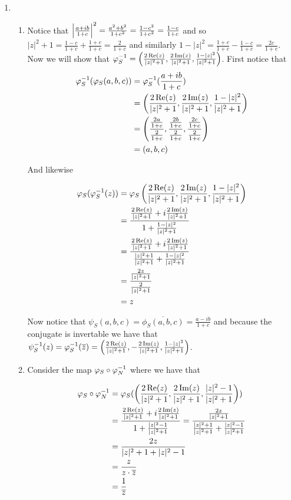 \documentclass[12pt]{amsart}
\begin{document}
\begin{enumerate}
\item 
\begin{enumerate}
    \item Notice that $\left| \frac{a+ib}{1+c} \right|^2=\frac{a^2+b^2}{1+c^2}=\frac{1-c^2}{1+c^2}=\frac{1-c}{1+c}$ and so $|z|^2+1=\frac{1-c}{1+c}+\frac{1+c}{1+c}=\frac{2}{1+c}$ and similarly $1-|z|^2=\frac{1+c}{1+c}-\frac{1-c}{1+c}=\frac{2c}{1+c}$. Now we will show that $\oldphi_S^{-1}=\left(\frac{2\Real(z)}{|z|^2+1}, \frac{2\Imag(z)}{|z|^2+1}, \frac{1-|z|^2}{|z|^2+1}\right)$. First notice that 
\begin{align*}
    \oldphi^{-1}_S(\oldphi_S(a,b,c))&=\oldphi^{-1}_S(\frac{a+ib}{1+c})\\
    &=\left(\frac{2\Real(z)}{|z|^2+1}, \frac{2\Imag(z)}{|z|^2+1}, \frac{1-|z|^2}{|z|^2+1}\right)\\
    &=\left(\frac{\frac{2a}{1+c}}{\frac{2}{1+c}}, \frac{\frac{2b}{1+c}}{\frac{2}{1+c}}, \frac{\frac{2c}{1+c}}{\frac{2}{1+c}}\right)\\
    &=\left(a, b, c\right)\\
\end{align*}

And likewise 

\begin{align*}
    \oldphi_S(\oldphi^{-1}_S(z))&=\oldphi_S\left(\frac{2\Real(z)}{|z|^2+1}, \frac{2\Imag(z)}{|z|^2+1}, \frac{1-|z|^2}{|z|^2+1}\right)\\
    &=\frac{\frac{2\Real(z)}{|z|^2+1}+i\frac{2\Imag(z)}{|z|^2+1}}{1+\frac{1-|z|^2}{|z|^2+1}}\\
    &=\frac{\frac{2\Real(z)}{|z|^2+1}+i\frac{2\Imag(z)}{|z|^2+1}}{\frac{|z|^2+1}{|z|^2+1}+\frac{1-|z|^2}{|z|^2+1}}\\
    &=\frac{\frac{2z}{|z|^2+1}}{\frac{2}{|z|^2+1}}\\
    &= z
\end{align*}

Now notice that $\psi_S(a,b,c)=\overline{\phi_S(a,b,c)}=\frac{a-ib}{1+c}$ and because the conjugate is invertable we have that $\psi^{-1}_S(z)=\varphi^{-1}_S(\overline{z})=\left(\frac{2\operatorname{\mathrm{Re}}(z)}{|z|^2+1}, -\frac{2\operatorname{\mathrm{Im}}(z)}{|z|^2+1}, \frac{1-|z|^2}{|z|^2+1}\right)$.\\

\item Consider the map $\oldphi_S\circ\oldphi^{-1}_N$ where we have that

\begin{align*}
    \oldphi_S\circ\oldphi^{-1}_N &= \oldphi_S(\left(\frac{2\Real(z)}{|z|^2+1}, \frac{2\Imag(z)}{|z|^2+1}, \frac{|z|^2-1}{|z|^2+1}\right))\\
    &= \frac{\frac{2\Real(z)}{|z|^2+1}+i\frac{2\Imag(z)}{|z|^2+1}}{1+\frac{|z|^2-1}{|z|^2+1}}
    = \frac{\frac{2z}{|z|^2+1}}{\frac{|z|^2+1}{|z|^2+1}+\frac{|z|^2-1}{|z|^2+1}}\\
    &= \frac{2z}{|z|^2+1+|z|^2-1}\\
    &= \frac{z}{z\cdot \overbar{z}}\\
    &= \frac{1}{\overbar{z}}
\end{align*}


\end{enumerate}
\end{enumerate}
\end{document}
